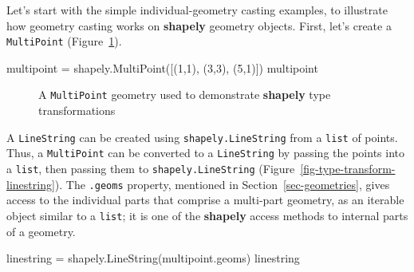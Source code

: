 \documentclass[
  letterpaper,
]{krantz}
\newenvironment{Shaded}{\begin{snugshade}}{\end{snugshade}}
\newcommand{\DecValTok}[1]{\textcolor[rgb]{0.68,0.00,0.00}{#1}}
\newcommand{\NormalTok}[1]{\textcolor[rgb]{0.00,0.23,0.31}{#1}}
\newcommand{\OperatorTok}[1]{\textcolor[rgb]{0.37,0.37,0.37}{#1}}
\begin{document}
Let's start with the simple individual-geometry casting examples, to
illustrate how geometry casting works on \textbf{shapely} geometry
objects. First, let's create a
\texttt{\textquotesingle{}MultiPoint\textquotesingle{}}
(Figure~\ref{fig-type-transform-multipoint}).

\begin{Shaded}
\begin{Highlighting}[]
\NormalTok{multipoint }\OperatorTok{=}\NormalTok{ shapely.MultiPoint([(}\DecValTok{1}\NormalTok{,}\DecValTok{1}\NormalTok{), (}\DecValTok{3}\NormalTok{,}\DecValTok{3}\NormalTok{), (}\DecValTok{5}\NormalTok{,}\DecValTok{1}\NormalTok{)])}
\NormalTok{multipoint}
\end{Highlighting}
\end{Shaded}

\begin{figure}[H]


\caption{\label{fig-type-transform-multipoint}A
\texttt{\textquotesingle{}MultiPoint\textquotesingle{}} geometry used to
demonstrate \textbf{shapely} type transformations}

\end{figure}%

A \texttt{\textquotesingle{}LineString\textquotesingle{}} can be created
using \texttt{shapely.LineString} from a \texttt{list} of points. Thus,
a \texttt{\textquotesingle{}MultiPoint\textquotesingle{}} can be
converted to a \texttt{\textquotesingle{}LineString\textquotesingle{}}
by passing the points into a \texttt{list}, then passing them to
\texttt{shapely.LineString}
(Figure~\ref{fig-type-transform-linestring}). The \texttt{.geoms}
property, mentioned in Section~\ref{sec-geometries}, gives access to the
individual parts that comprise a multi-part geometry, as an iterable
object similar to a \texttt{list}; it is one of the \textbf{shapely}
access methods to internal parts of a geometry.

\begin{Shaded}
\begin{Highlighting}[]
\NormalTok{linestring }\OperatorTok{=}\NormalTok{ shapely.LineString(multipoint.geoms)}
\NormalTok{linestring}
\end{Highlighting}
\end{Shaded}
\end{document}
